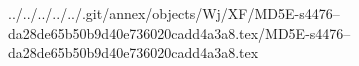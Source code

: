 ../../../../../.git/annex/objects/Wj/XF/MD5E-s4476--da28de65b50b9d40e736020cadd4a3a8.tex/MD5E-s4476--da28de65b50b9d40e736020cadd4a3a8.tex